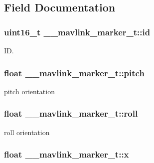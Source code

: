 \subsection{Field Documentation}
\hypertarget{struct____mavlink__marker__t_ab0bc0483b9837a8e1c28c2badb3342ee}{
\subsubsection[{id}]{\setlength{\rightskip}{0pt plus 5cm}uint16\+\_\+t \+\_\+\+\_\+mavlink\+\_\+marker\+\_\+t\+::id}}\label{struct____mavlink__marker__t_ab0bc0483b9837a8e1c28c2badb3342ee}


I\+D. 

\hypertarget{struct____mavlink__marker__t_a6001da416b7160647e751478b47ecefd}{
\subsubsection[{pitch}]{\setlength{\rightskip}{0pt plus 5cm}float \+\_\+\+\_\+mavlink\+\_\+marker\+\_\+t\+::pitch}}\label{struct____mavlink__marker__t_a6001da416b7160647e751478b47ecefd}


pitch orientation 

\hypertarget{struct____mavlink__marker__t_a83b50e31d93a8078a07481ba7cbee5f3}{
\subsubsection[{roll}]{\setlength{\rightskip}{0pt plus 5cm}float \+\_\+\+\_\+mavlink\+\_\+marker\+\_\+t\+::roll}}\label{struct____mavlink__marker__t_a83b50e31d93a8078a07481ba7cbee5f3}


roll orientation 

\hypertarget{struct____mavlink__marker__t_a31a7e83717fee9c5010abfdcaefe676d}{
\subsubsection[{x}]{\setlength{\rightskip}{0pt plus 5cm}float \+\_\+\+\_\+mavlink\+\_\+marker\+\_\+t\+::x}}\label{struct____mavlink__marker__t_a31a7e83717fee9c5010abfdcaefe676d}


